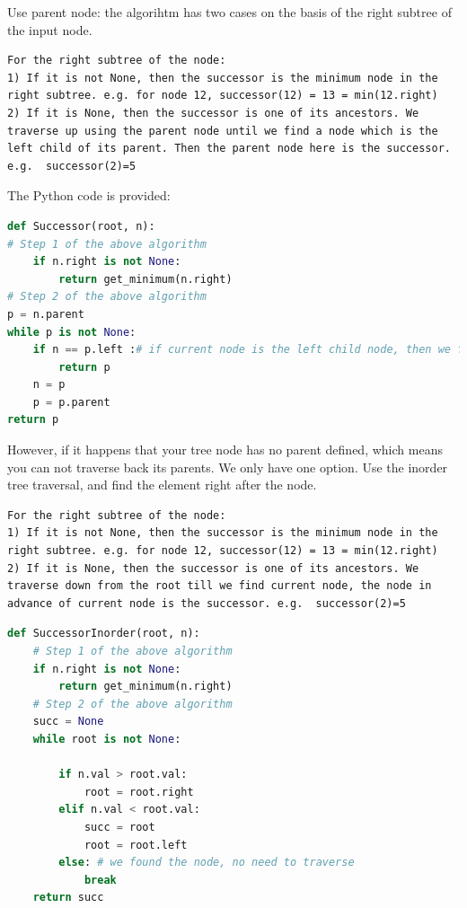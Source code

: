 \documentclass[../main.tex]{subfiles}
\begin{document}
Use parent node: the algorihtm has two cases on the basis of the right subtree of the input node. 
\begin{lstlisting}[numbers=none]
For the right subtree of the node:
1) If it is not None, then the successor is the minimum node in the right subtree. e.g. for node 12, successor(12) = 13 = min(12.right)
2) If it is None, then the successor is one of its ancestors. We traverse up using the parent node until we find a node which is the left child of its parent. Then the parent node here is the successor. e.g.  successor(2)=5
\end{lstlisting}
 The Python code is provided:
\begin{lstlisting}[language = Python]
def Successor(root, n):
# Step 1 of the above algorithm
    if n.right is not None:
        return get_minimum(n.right)
# Step 2 of the above algorithm
p = n.parent
while p is not None:
    if n == p.left :# if current node is the left child node, then we found the successor, p
        return p
    n = p
    p = p.parent
return p
\end{lstlisting}
However, if it happens that your tree node has no parent defined, which means you can not traverse back its parents. We only have one option. Use the inorder tree traversal, and find the element right after the node. \begin{lstlisting}[numbers=none]
For the right subtree of the node:
1) If it is not None, then the successor is the minimum node in the right subtree. e.g. for node 12, successor(12) = 13 = min(12.right)
2) If it is None, then the successor is one of its ancestors. We traverse down from the root till we find current node, the node in advance of current node is the successor. e.g.  successor(2)=5
\end{lstlisting}
\begin{lstlisting}[language=Python]
def SuccessorInorder(root, n):
    # Step 1 of the above algorithm
    if n.right is not None:
        return get_minimum(n.right)
    # Step 2 of the above algorithm
    succ = None
    while root is not None:
        
        if n.val > root.val:
            root = root.right
        elif n.val < root.val:
            succ = root
            root = root.left
        else: # we found the node, no need to traverse
            break
    return succ
\end{lstlisting}
\end{document}
